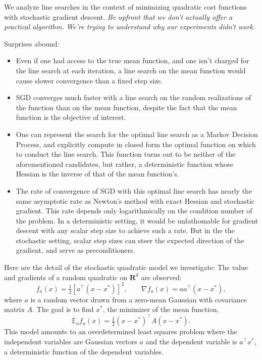 \documentclass{article}
\newcommand{\half}{\tfrac{1}{2}}
\newcommand{\E}{\mathbb{E}}
\newcommand{\R}{\mathbf{R}}
\begin{document}
We analyze line searches in the context of minimizing quadratic cost functions with stochastic gradient descent. {\it Be upfront that we don't actually offer a practical algorithm. We're trying to understand why our experiments didn't work.} 

Surprises abound:
\begin{itemize}
    \item  Even if one had access to the true mean function, and one isn't charged for the line search at each iteration, a line search on the mean function would cause slower convergence than a fixed step size.
    \item SGD converges much faster with a line search on the random realizations of the function than on the mean function, despite the fact that the mean function is the objective of interest.
    \item One can represent the search for the optimal line search as a Markov Decision Process, and explicitly compute in closed form the optimal function on which to conduct the line search. This function turns out to be neither of the aforementioned candidates, but rather, a deterministic function whose Hessian is the inverse of that of the mean function's. 
    \item The rate of convergence of SGD with this optimal line search has nearly the same asymptotic rate  as Newton's method with exact Hessian and stochastic gradient. This rate depends only logarithmically on the condition number of the problem. In a deterministic setting, it would be unfathomable for gradient descent with any scalar step size to achieve such a rate. But in the the stochastic setting, scalar step sizes can steer the expected direction of the gradient, and serve as preconditioners.
\end{itemize}


Here are the detail of the stochastic quadratic model we investigate: The value and gradients of a random quadratic on $\R^d$ are observed:
\begin{equation}\label{eq:stoch-model}
f_a(x) = \half \left[a^\top (x-x^*)\right]^2, \qquad \nabla f_a(x) = aa^\top (x-x^*),
\end{equation}
where $a$ is a random vector drawn from a zero-mean Gaussian with covariance matrix $A$. The goal is to find $x^*$, the minimizer of the mean function,
\begin{equation}\label{eq:mean-model}
 \E_a f_a(x) = \half (x-x^*)^\top A (x-x^*).
\end{equation}
This model amounts to an overdetermined least squares problem where the independent variables are Gaussian vectors $a$ and the dependent variable is $a^\top x^*$,  a deterministic function of the dependent variables.
\end{document}
